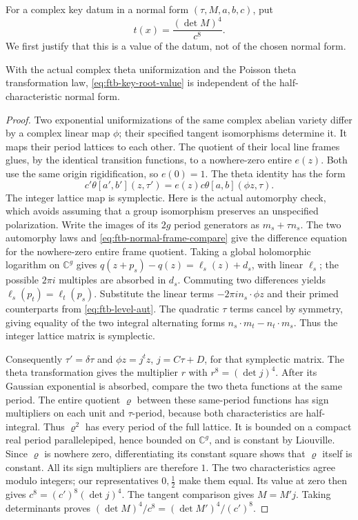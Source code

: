 For a complex key datum in a normal form \((\tau,M,a,b,c)\), put
\[
                            t(x)=\frac{(\det M)^4}{c^8}.
 \tag{R1}\label{eq:ftb-key-root-value}
\]
We first justify that this is a value of the datum, not of the
chosen normal form.

\begin{srlemma}
\label{lem:ftb-key-normal-value-unique}
With the actual complex theta uniformization and the Poisson theta
transformation law, \eqref{eq:ftb-key-root-value} is independent of
the half-characteristic normal form.
\end{srlemma}
\begin{proof}
Two exponential uniformizations of the same complex abelian variety
differ by a complex linear map \(\phi\); their specified tangent
isomorphisms determine it.  It maps their period lattices to each
other.  The quotient of their local line frames glues, by the
identical transition functions, to a nowhere-zero entire \(e(z)\).
Both use the same origin rigidification, so \(e(0)=1\).
The theta identity has the form
\[
        c'\theta[a',b'](z,\tau')
                 =e(z)c\theta[a,b](\phi z,\tau).
 \tag{R2}\label{eq:ftb-normal-frame-compare}
\]
The integer lattice map is symplectic.  Here is the actual
automorphy check, which avoids assuming that a group isomorphism
preserves an unspecified polarization.  Write the images of its
\(2g\) period generators as \(m_s+\tau n_s\).
The two automorphy laws and \eqref{eq:ftb-normal-frame-compare}
give the difference equation for the nowhere-zero entire frame
quotient.  Taking a global holomorphic logarithm on \(\mathbb C^g\)
gives
\(q(z+p_s)-q(z)=\ell_s(z)+d_s\), with linear \(\ell_s\);
the possible \(2\pi i\) multiples are absorbed in \(d_s\).
Commuting two differences yields
\(\ell_s(p_t)=\ell_t(p_s)\).
Substitute the linear terms \(-2\pi i n_s\cdot\phi z\)
and their primed counterparts from \eqref{eq:ftb-level-aut}.
The quadratic \(\tau\) terms cancel by symmetry, giving equality
of the two integral alternating forms
\(n_s\cdot m_t-n_t\cdot m_s\).
Thus the integer lattice matrix is symplectic.

Consequently \(\tau'=\delta\tau\) and
\(\phi z=j^tz\), \(j=C\tau+D\), for that symplectic matrix.
The theta transformation gives the multiplier \(r\) with
\(r^8=(\det j)^4\).
After its Gaussian exponential is absorbed, compare the two
theta functions at the same period.  The entire quotient \(\varrho\) between these same-period
functions has sign multipliers on each unit and \(\tau\)-period,
because both characteristics are half-integral.
Thus \(\varrho^2\) has every period of the full lattice.
It is bounded on a compact real period parallelepiped, hence
bounded on \(\mathbb C^g\), and is constant by Liouville.
Since \(\varrho\) is nowhere zero, differentiating its constant
square shows that \(\varrho\) itself is constant.
All its sign multipliers are therefore \(1\).
The two characteristics agree modulo integers; our representatives
\(0,\tfrac12\) make them equal.  Its value at zero then gives
\(c^8=(c')^8(\det j)^4\).
The tangent comparison gives \(M=M'j\).
Taking determinants proves
\((\det M)^4/c^8=(\det M')^4/(c')^8\).
\end{proof}

